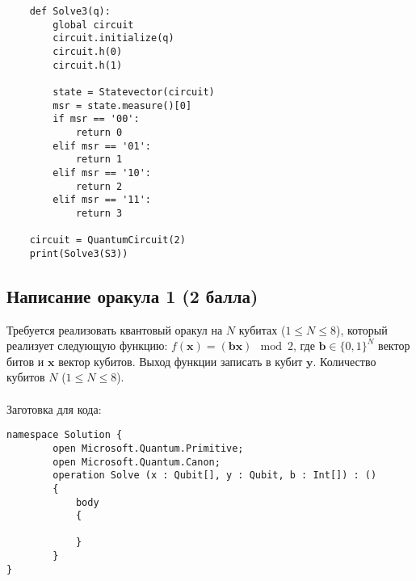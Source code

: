 \documentclass{article}
\begin{document}
\begin{verbatim}
    def Solve3(q):
        global circuit
        circuit.initialize(q)
        circuit.h(0)
        circuit.h(1)
    
        state = Statevector(circuit)
        msr = state.measure()[0]
        if msr == '00':
            return 0
        elif msr == '01':
            return 1
        elif msr == '10':
            return 2
        elif msr == '11':
            return 3
    
    circuit = QuantumCircuit(2)
    print(Solve3(S3))
\end{verbatim}





\subsection{Написание оракула 1 (2 балла)}

Требуется реализовать квантовый оракул на $N$ кубитах ($1 \le N \le 8$), который реализует следующую функцию: $f(\pmb{x}) = (\pmb{b}\pmb{x}) \mod 2$, где  $\pmb{b} \in \{0,1\}^N$ вектор битов и  $\pmb{x}$ вектор кубитов. Выход функции записать в кубит $\pmb{y}$. Количество кубитов $N$ ($1 \le N \le 8$). 
\\\\
Заготовка для кода:
\begin{lstlisting}
namespace Solution {
        open Microsoft.Quantum.Primitive;
        open Microsoft.Quantum.Canon;
        operation Solve (x : Qubit[], y : Qubit, b : Int[]) : ()
        {
            body
            {

            }
        }
}
\end{lstlisting}
\end{document}
